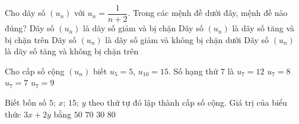 \begin{ex}%
	Cho dãy số $(u_n)$ với $u_n=\dfrac{1}{n+2}$. Trong các mệnh đề dưới đây, mệnh đề nào đúng?
	\choice
	{\True Dãy số $(u_n)$ là dãy số giảm và bị chặn}
	{Dãy số $(u_n)$ là dãy số tăng và bị chặn trên}
	{Dãy số $(u_n)$ là dãy số giảm và không bị chặn dưới}
	{Dãy số $(u_n)$ là dãy số tăng và không bị chặn trên}
\end{ex}
\begin{ex}%
	Cho cấp số cộng $(u_n)$ biết $u_5=5$, $u_{10}=15$. Số hạng thứ $7$ là
	\choice
	{$u_7=12$}
	{$u_7=8$}
	{$u_7=7$}
	{\True $u_7=9$}
\end{ex}
\begin{ex}%
	Biết bốn số $5$; $x$; $15$; $y$ theo thứ tự đó lập thành cấp số cộng. Giá trị của biểu thức $3x+2y$ bằng
	\choice
	{$50$}
	{\True $70$}
	{$30$}
	{$80$}
\end{ex}
